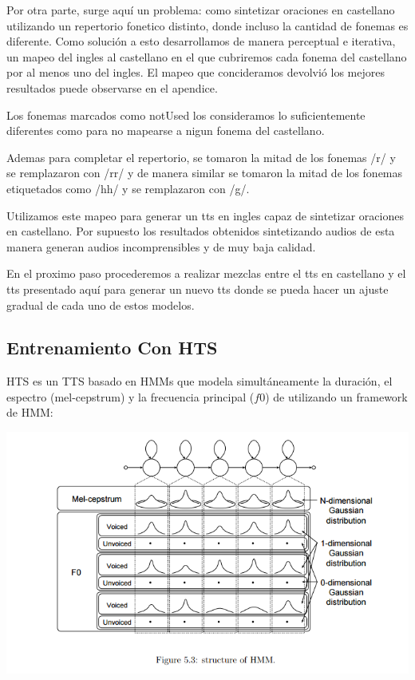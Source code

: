 Por otra parte, surge aquí un problema: como sintetizar oraciones en castellano utilizando un repertorio fonetico distinto, donde incluso la cantidad de fonemas es diferente. Como solución a esto desarrollamos de manera perceptual e iterativa, un mapeo del ingles al castellano en el que cubriremos cada fonema del castellano por al menos uno del ingles. El mapeo que concideramos devolvió los mejores resultados puede observarse en el apendice.

Los fonemas marcados como notUsed los consideramos lo suficientemente diferentes como para no mapearse a nigun fonema del castellano.

Ademas para completar el repertorio, se tomaron la mitad de los fonemas /r/ y se remplazaron con /rr/ y de manera similar se tomaron la mitad de los fonemas etiquetados como /hh/ y se remplazaron con /g/.

Utilizamos este mapeo para generar un tts en ingles capaz de sintetizar oraciones en castellano. Por supuesto los resultados obtenidos sintetizando audios de esta manera generan audios incomprensibles y de muy baja calidad.

En el proximo paso procederemos a realizar mezclas entre el tts en castellano y el tts presentado aquí para generar un nuevo tts donde se pueda hacer un ajuste gradual de cada uno de estos modelos. 


\subsection{Entrenamiento Con HTS}

HTS es un TTS basado en HMMs que modela simultáneamente la duración, el espectro (mel-cepstrum) y la frecuencia principal ($f0$) de utilizando un framework de HMM:

\includegraphics[scale=0.5]{imagenes/hmm.png}


